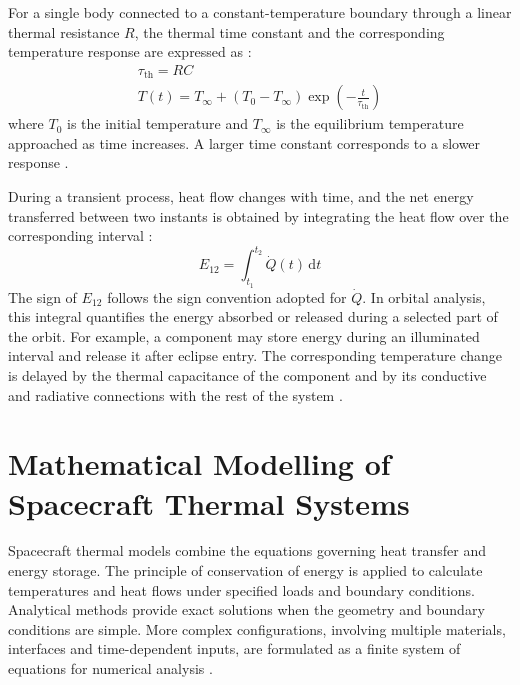 For a single body connected to a constant-temperature boundary through a linear 
thermal resistance $R$, the thermal time constant and the corresponding temperature 
response are expressed as \cite{hmt_f&a}:
\begin{gather}
    \tau_{\mathrm{th}} = RC
    \label{eq:thermal_time_constant}
    \\[0.6em]
    T(t)
    =
    T_{\infty}
    +
    \left(T_{0}-T_{\infty}\right)
    \exp\left(-\frac{t}{\tau_{\mathrm{th}}}\right)
    \label{eq:first_order_thermal_response}
\end{gather}
where $T_0$ is the initial temperature and $T_\infty$ is the equilibrium temperature 
approached as time increases. A larger time constant corresponds to a slower response 
\cite{hmt_f&a}.

During a transient process, heat flow changes with time, and the net energy 
transferred between two instants is obtained by integrating the heat flow over 
the corresponding interval \cite{hmt_f&a}:
\begin{equation}
    E_{12}
    =
    \int_{t_1}^{t_2}
    \dot{Q}(t)\,\mathrm{d}t
    \label{eq:integrated_thermal_energy}
\end{equation}
The sign of $E_{12}$ follows the sign convention adopted for $\dot{Q}$. In orbital 
analysis, this integral quantifies the energy absorbed or released during a selected part 
of the orbit. For example, a component may store energy during an illuminated interval and
release it after eclipse entry. The corresponding temperature change is delayed
by the thermal capacitance of the component and by its conductive and radiative
connections with the rest of the system 
\cite{spacethctrl,th_handbook}.

\section{Mathematical Modelling of Spacecraft Thermal Systems}

Spacecraft thermal models combine the equations governing heat transfer and energy 
storage. The principle of conservation of energy is applied to calculate temperatures 
and heat flows under specified loads and boundary conditions. Analytical methods provide 
exact solutions when the geometry and boundary conditions are simple. More complex 
configurations, involving multiple materials, interfaces and time-dependent inputs, are 
formulated as a finite system of equations for numerical analysis 
\cite{spacethctrl,ecss_man}.

